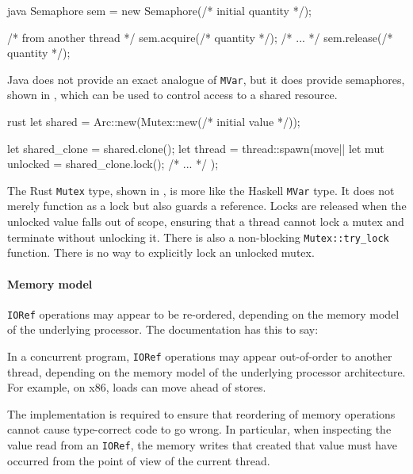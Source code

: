 \begin{listing}
\centering
\begin{cminted}{java}
Semaphore sem = new Semaphore(/* initial quantity */);

/* from another thread */
sem.acquire(/* quantity */);
/* ... */
sem.release(/* quantity */);
\end{cminted}
\caption{Mutual exclusion in Java.}\label{lst:mute_java}
\end{listing}

Java does not provide an exact analogue of \verb|MVar|, but it does
provide semaphores, shown in , which can be used
to control access to a shared resource.

\begin{listing}
\centering
\begin{cminted}{rust}
let shared = Arc::new(Mutex::new(/* initial value */));

let shared_clone = shared.clone();
let thread = thread::spawn(move|| {
    let mut unlocked = shared_clone.lock();
    /* ... */
});
\end{cminted}
\caption{Mutual exclusion in Rust.}\label{lst:mute_rust}
\end{listing}

The Rust \verb|Mutex| type, shown in , is more
like the Haskell \verb|MVar| type.  It does not merely function as a
lock but also guards a reference.  Locks are released when the
unlocked value falls out of scope, ensuring that a thread cannot lock
a mutex and terminate without unlocking it.  There is also a
non-blocking \verb|Mutex::try_lock| function.  There is no way to
explicitly lock an unlocked mutex.

\paragraph{Memory model}
\verb|IORef| operations may appear to be re-ordered, depending on the
memory model of the underlying processor.  The documentation has this
to say:

\begin{displayquote}
  In a concurrent program, \verb|IORef| operations may appear out-of-order to
  another thread, depending on the memory model of the underlying processor
  architecture.  For example, on x86, loads can move ahead of stores.

  The implementation is required to ensure that reordering of memory operations
  cannot cause type-correct code to go wrong.  In particular, when inspecting
  the value read from an \verb|IORef|, the memory writes that created that value
  must have occurred from the point of view of the current thread.\cite{data_ioref}
\end{displayquote}

